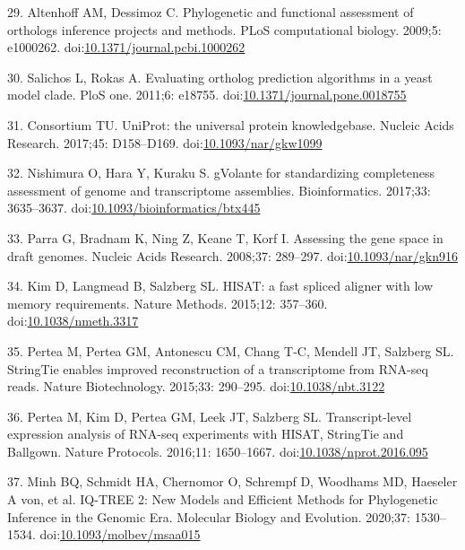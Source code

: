 \documentclass[]{elsarticle} %
\begin{document}
\leavevmode\hypertarget{ref-AltenhoffAndDessimoz2009}{}%
29. Altenhoff AM, Dessimoz C. Phylogenetic and functional assessment of orthologs inference projects and methods. PLoS computational biology. 2009;5: e1000262. doi:\href{https://doi.org/10.1371/journal.pcbi.1000262}{10.1371/journal.pcbi.1000262}

\leavevmode\hypertarget{ref-SalichosAndRokas2011}{}%
30. Salichos L, Rokas A. Evaluating ortholog prediction algorithms in a yeast model clade. PloS one. 2011;6: e18755. doi:\href{https://doi.org/10.1371/journal.pone.0018755}{10.1371/journal.pone.0018755}

\leavevmode\hypertarget{ref-uniprot}{}%
31. Consortium TU. UniProt: the universal protein knowledgebase. Nucleic Acids Research. 2017;45: D158--D169. doi:\href{https://doi.org/10.1093/nar/gkw1099}{10.1093/nar/gkw1099}

\leavevmode\hypertarget{ref-gVolante}{}%
32. Nishimura O, Hara Y, Kuraku S. gVolante for standardizing completeness assessment of genome and transcriptome assemblies. Bioinformatics. 2017;33: 3635--3637. doi:\href{https://doi.org/10.1093/bioinformatics/btx445}{10.1093/bioinformatics/btx445}

\leavevmode\hypertarget{ref-CEGMA}{}%
33. Parra G, Bradnam K, Ning Z, Keane T, Korf I. Assessing the gene space in draft genomes. Nucleic Acids Research. 2008;37: 289--297. doi:\href{https://doi.org/10.1093/nar/gkn916}{10.1093/nar/gkn916}

\leavevmode\hypertarget{ref-HISAT}{}%
34. Kim D, Langmead B, Salzberg SL. HISAT: a fast spliced aligner with low memory requirements. Nature Methods. 2015;12: 357--360. doi:\href{https://doi.org/10.1038/nmeth.3317}{10.1038/nmeth.3317}

\leavevmode\hypertarget{ref-StringTie}{}%
35. Pertea M, Pertea GM, Antonescu CM, Chang T-C, Mendell JT, Salzberg SL. StringTie enables improved reconstruction of a transcriptome from RNA-seq reads. Nature Biotechnology. 2015;33: 290--295. doi:\href{https://doi.org/10.1038/nbt.3122}{10.1038/nbt.3122}

\leavevmode\hypertarget{ref-Tuxedo}{}%
36. Pertea M, Kim D, Pertea GM, Leek JT, Salzberg SL. Transcript-level expression analysis of RNA-seq experiments with HISAT, StringTie and Ballgown. Nature Protocols. 2016;11: 1650--1667. doi:\href{https://doi.org/10.1038/nprot.2016.095}{10.1038/nprot.2016.095}

\leavevmode\hypertarget{ref-IQTREE}{}%
37. Minh BQ, Schmidt HA, Chernomor O, Schrempf D, Woodhams MD, Haeseler A von, et al. IQ-TREE 2: New Models and Efficient Methods for Phylogenetic Inference in the Genomic Era. Molecular Biology and Evolution. 2020;37: 1530--1534. doi:\href{https://doi.org/10.1093/molbev/msaa015}{10.1093/molbev/msaa015}
\end{document}
